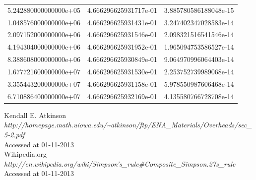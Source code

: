\documentclass[pdf,color]{UoBnote}
\begin{document}
\begin{table}[H]
\begin{tabular}{|l|l|l|}
        5.242880000000000e+05 & 4.666296625931717e-01 & 3.885780586188048e-15 \\ 
        1.048576000000000e+06 & 4.666296625931431e-01 & 3.247402347028583e-14 \\ 
        2.097152000000000e+06 & 4.666296625931546e-01 & 2.098321516541546e-14 \\ 
        4.194304000000000e+06 & 4.666296625931952e-01 & 1.965094753586527e-14 \\ 
        8.388608000000000e+06 & 4.666296625930849e-01 & 9.064970996064403e-14 \\ 
        1.677721600000000e+07 & 4.666296625931530e-01 & 2.253752739989068e-14 \\ 
        3.355443200000000e+07 & 4.666296625931158e-01 & 5.978550987606468e-14 \\ 
        6.710886400000000e+07 & 4.666296625932169e-01 & 4.135580766728708e-14 \\
        \hline
    \end{tabular}
\end{table}

\begin{thebibliography}{breitestes Label}
	 Kendall E. Atkinson\\{\em http://homepage.math.uiowa.edu/\textasciitilde{}atkinson/ftp/ENA\_Materials/Overheads/sec\_5-2.pdf}\\Accessed at 01-11-2013\\
	 Wikipedia.org\\{\em http://en.wikipedia.org/wiki/Simpson's\_rule\#Composite\_Simpson.27s\_rule}\\Accessed at 01-11-2013
\end{thebibliography}
\end{document}
